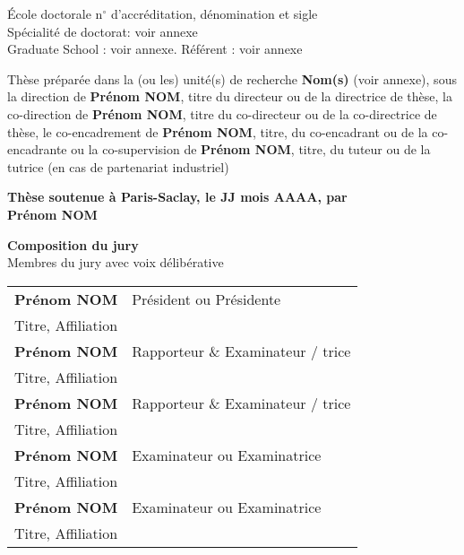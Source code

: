 \documentclass[french,12pt,a4paper]{book}
\begin{document}
\begin{titlepage}
\vspace{6mm}

\small École doctorale n$^{\circ}$ d'accréditation, dénomination et sigle\\
\small Spécialité de doctorat: voir annexe\\
\small Graduate School : voir annexe. Référent : voir annexe \\
\vspace{6mm}

\footnotesize Thèse préparée dans la (ou les) unité(s) de recherche \textbf{Nom(s)} (voir annexe), sous la direction de \textbf{Prénom NOM}, titre du directeur ou de la directrice de thèse, la co-direction de \textbf{Prénom NOM}, titre du co-directeur ou de la co-directrice de thèse, le co-encadrement de \textbf{Prénom NOM}, titre, du co-encadrant ou de la co-encadrante ou la co-supervision de \textbf{Prénom NOM}, titre, du tuteur ou de la tutrice (en cas de partenariat industriel) \\
\vspace{15mm}

\textbf{Thèse soutenue à Paris-Saclay, le JJ mois AAAA, par}\\
\bigskip
\Large {\color{Prune} \textbf{Prénom NOM}} %

\vspace{\fill} %

\bigskip

\flushleft
\small {\color{Prune} \textbf{Composition du jury}}\\
{\color{Prune} \scriptsize {Membres du jury avec voix délibérative}} \\
\vspace{2mm}
\scriptsize
\begin{tabular}{|p{7cm}l}
\arrayrulecolor{Prune}
\textbf{Prénom NOM} &   Président ou Présidente\\ 
Titre, Affiliation & \\
\textbf{Prénom NOM} &  Rapporteur \& Examinateur / trice \\ 
Titre, Affiliation   &   \\ 
\textbf{Prénom NOM} &  Rapporteur \& Examinateur / trice \\ 
Titre, Affiliation  &   \\ 
\textbf{Prénom NOM} &  Examinateur ou Examinatrice \\ 
Titre, Affiliation   &   \\ 
\textbf{Prénom NOM} &  Examinateur ou Examinatrice \\ 
Titre, Affiliation   &   \\ 
 

\end{tabular} 

\end{titlepage}
\end{document}

